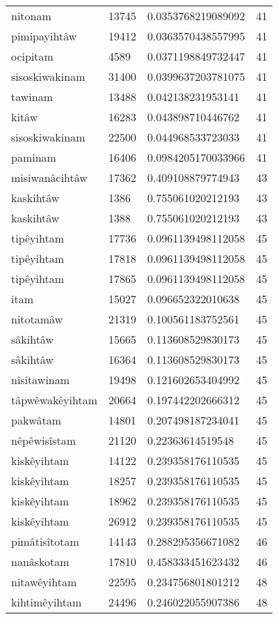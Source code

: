 \begin{longtable}{llll}
nitonam & 13745 & 0.0353768219089092 & 41 \\
pimipayihtâw & 19412 & 0.0363570438557995 & 41 \\
ocipitam & 4589 & 0.0371198849732447 & 41 \\
sisoskiwakinam & 31400 & 0.0399637203781075 & 41 \\
tawinam & 13488 & 0.042138231953141 & 41 \\
kitâw & 16283 & 0.043898710446762 & 41 \\
sisoskiwakinam & 22500 & 0.044968533723033 & 41 \\
paminam & 16406 & 0.0984205170033966 & 41 \\
misiwanâcihtâw & 17362 & 0.409108879774943 & 43 \\
kaskihtâw & 1386 & 0.755061020212193 & 43 \\
kaskihtâw & 1388 & 0.755061020212193 & 43 \\
tipêyihtam & 17736 & 0.0961139498112058 & 45 \\
tipêyihtam & 17818 & 0.0961139498112058 & 45 \\
tipêyihtam & 17865 & 0.0961139498112058 & 45 \\
itam & 15027 & 0.096652322010638 & 45 \\
nitotamâw & 21319 & 0.100561183752561 & 45 \\
sâkihtâw & 15665 & 0.113608529830173 & 45 \\
sâkihtâw & 16364 & 0.113608529830173 & 45 \\
nisitawinam & 19498 & 0.121602653404992 & 45 \\
tâpwêwakêyihtam & 20664 & 0.197442202666312 & 45 \\
pakwâtam & 14801 & 0.207498187234041 & 45 \\
nêpêwisîstam & 21120 & 0.22363614519548 & 45 \\
kiskêyihtam & 14122 & 0.239358176110535 & 45 \\
kiskêyihtam & 18257 & 0.239358176110535 & 45 \\
kiskêyihtam & 18962 & 0.239358176110535 & 45 \\
kiskêyihtam & 26912 & 0.239358176110535 & 45 \\
pimâtisîtotam & 14143 & 0.288295356671082 & 46 \\
nanâskotam & 17810 & 0.458333451623432 & 46 \\
nitawêyihtam & 22595 & 0.234756801801212 & 48 \\
kihtimêyihtam & 24496 & 0.246022055907386 & 48 \\

\end{longtable}
